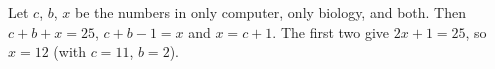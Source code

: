 Let $c$, $b$, $x$ be the numbers in only computer, only biology, and both. Then $c+b+x=25$, $c+b-1=x$ and $x=c+1$. The first two give $2x+1=25$, so $x=\boxed{12}$ (with $c=11$, $b=2$).
